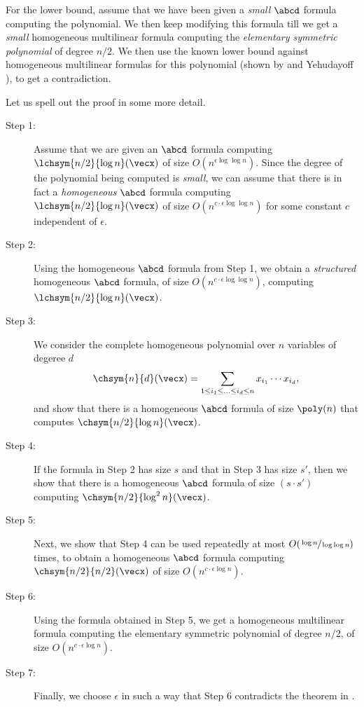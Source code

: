 \vspace{1em}
\noindent For the lower bound, assume that we have been given a \emph{small} $\abcd$ formula computing the polynomial.
We then keep modifying this formula till we get a \emph{small} homogeneous multilinear formula computing the \emph{elementary symmetric polynomial} of degree $n/2$. 
We then use the known lower bound against homogeneous multilinear formulas for this polynomial (shown by {\Hrubes} and Yehudayoff \cite{HY11}), to get a contradiction.

Let us spell out the proof in some more detail.

\begin{description}
	\item[Step 1:] Assume that we are given an $\abcd$ formula  computing $\lchsym{n/2}{\log n}(\vecx)$ of size $O(n^{\epsilon \log \log n})$.
	Since the degree of the polynomial being computed is \emph{small}, we can assume that there is in fact a \emph{homogeneous} $\abcd$ formula computing $\lchsym{n/2}{\log n}(\vecx)$ of size $O(n^{c \cdot \epsilon \log \log n})$ for some constant $c$ independent of $\epsilon$.
	\item[Step 2:] Using the homogeneous $\abcd$ formula from Step 1, we obtain a \emph{structured} homogeneous $\abcd$ formula, of size $O(n^{c \cdot \epsilon \log \log n})$, computing $\lchsym{n/2}{\log n}(\vecx)$.
	\item[Step 3:] We consider the complete homogeneous polynomial over $n$ variables of degeree $d$ 
	\[
		\chsym{n}{d} (\vecx) = \sum_{1 \leq i_1 \leq \ldots \leq i_d \leq n} x_{i_1} \cdots x_{i_d},
	\]
	and show that there is a homogeneous $\abcd$ formula of size $\poly(n)$ that computes $\chsym{n/2}{\log n} (\vecx)$.
	\item[Step 4:] If the formula in Step 2 has size $s$ and that in Step 3 has size $s'$, then we show that there is a homogeneous $\abcd$ formula of size $(s \cdot s')$ computing $\chsym{n/2}{\log^2 n} (\vecx)$.
	\item[Step 5:] Next, we show that Step 4 can be used repeatedly at most $O(\sfrac{\log n}{\log \log n})$ times, to obtain a homogeneous $\abcd$ formula computing $\chsym{n/2}{n/2} (\vecx)$ of size $O(n^{c \cdot \epsilon \log n})$.
	\item[Step 6:] Using the formula obtained in Step 5, we get a homogeneous multilinear formula computing the elementary symmetric polynomial of degree $n/2$, of size $O(n^{c \cdot \epsilon \log n})$.
	\item[Step 7:] Finally, we choose $\epsilon$ in such a way that Step 6 contradicts the theorem in \cite{HY11}. 
\end{description}

